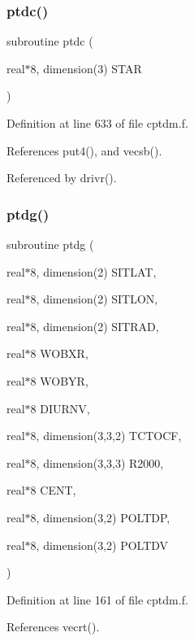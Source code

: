 \subsubsection{\texorpdfstring{ptdc()}{ptdc()}}
{\footnotesize\ttfamily subroutine ptdc (\begin{DoxyParamCaption}\item[{real$\ast$8, dimension(3)}]{S\+T\+AR }\end{DoxyParamCaption})}



Definition at line 633 of file cptdm.\+f.



References put4(), and vecsb().



Referenced by drivr().

\mbox{\label{cptdm_8f_a32ca03878e53b3fb9571d2fdc830b836}} 
\subsubsection{\texorpdfstring{ptdg()}{ptdg()}}
{\footnotesize\ttfamily subroutine ptdg (\begin{DoxyParamCaption}\item[{real$\ast$8, dimension(2)}]{S\+I\+T\+L\+AT,  }\item[{real$\ast$8, dimension(2)}]{S\+I\+T\+L\+ON,  }\item[{real$\ast$8, dimension(2)}]{S\+I\+T\+R\+AD,  }\item[{real$\ast$8}]{W\+O\+B\+XR,  }\item[{real$\ast$8}]{W\+O\+B\+YR,  }\item[{real$\ast$8}]{D\+I\+U\+R\+NV,  }\item[{real$\ast$8, dimension(3,3,2)}]{T\+C\+T\+O\+CF,  }\item[{real$\ast$8, dimension(3,3,3)}]{R2000,  }\item[{real$\ast$8}]{C\+E\+NT,  }\item[{real$\ast$8, dimension(3,2)}]{P\+O\+L\+T\+DP,  }\item[{real$\ast$8, dimension(3,2)}]{P\+O\+L\+T\+DV }\end{DoxyParamCaption})}



Definition at line 161 of file cptdm.\+f.



References vecrt().



